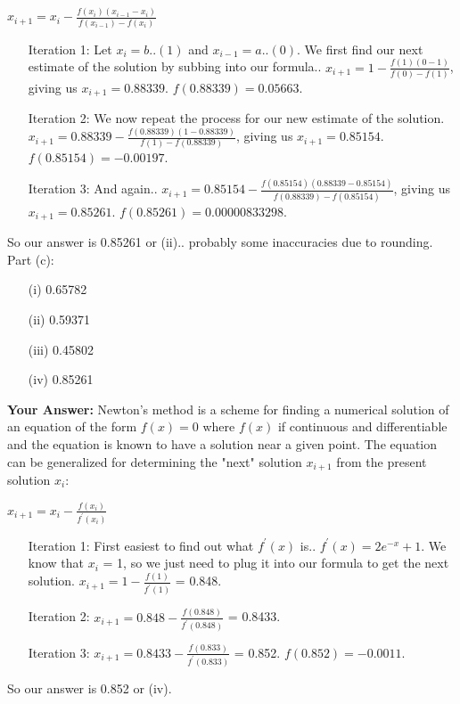 \documentclass[12pt,a4paper]{report}
\begin{document}
\begin{center}
$x_{i+1} = x_i - \frac{f(x_i)(x_{i-1}-x_i)}{f(x_{i-1})-f(x_i)}$
\end{center}
\begin{itemize}
\item[Iteration 1:] Let $x_i = b..(1)$ and $x_{i-1} = a..(0)$. We first find our next estimate of the solution by subbing into our formula.. $x_{i+1} = 1 - \frac{f(1)(0-1)}{f(0)-f(1)}$, giving us $x_{i+1} = 0.88339$. $f(0.88339) = 0.05663$.
\item[Iteration 2:] We now repeat the process for our new estimate of the solution. $x_{i+1} = 0.88339 - \frac{f(0.88339)(1-0.88339)}{f(1)-f(0.88339)}$, giving us $x_{i+1} = 0.85154$. $f(0.85154) = -0.00197$.
\item[Iteration 3:] And again.. $x_{i+1} = 0.85154 - \frac{f(0.85154)(0.88339-0.85154)}{f(0.88339)-f(0.85154)}$, giving us $x_{i+1} = 0.85261$. $f(0.85261) = 0.00000833298$.
\end{itemize}
So our answer is 0.85261 or (ii).. probably some inaccuracies due to rounding.
\newline
\newline
\newline
Part (c):
\begin{itemize}
\item[(i)] 0.65782
\item[(ii)] 0.59371
\item[(iii)] 0.45802
\item[(iv)] 0.85261
\end{itemize}
\textbf{Your Answer:}
\newline
Newton's method is a scheme for finding a numerical solution of an equation of the form $f(x) = 0 $ where $f(x)$ if continuous and differentiable and the equation is known to have a solution near a given point. The equation can be generalized for determining the "next" solution $x_{i+1}$ from the present solution $x_i$:
\begin{center}
$x_{i+1} = x_i - \frac{f(x_i)}{f^\prime(x_i)}$
\end{center}
\begin{itemize}
\item[Iteration 1:] First easiest to find out what $f^\prime(x)$ is.. $f^\prime(x) = 2e^{-x} + 1$. We know that $x_i$ = 1, so we just need to plug it into our formula to get the next solution. $x_{i+1} = 1 - \frac{f(1)}{f^\prime(1)}$ = 0.848.
\item[Iteration 2:] $x_{i+1} = 0.848 - \frac{f(0.848)}{f^\prime(0.848)}$ = 0.8433.
\item[Iteration 3:] $x_{i+1} = 0.8433 - \frac{f(0.833)}{f^\prime(0.833)}$ = 0.852. $f(0.852) = -0.0011$.
\end{itemize}
So our answer is 0.852 or (iv).
\newline
\end{document}
